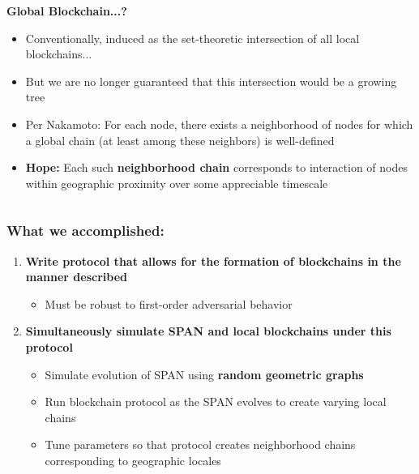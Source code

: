 \documentclass{beamer}
\begin{document}
\begin{frame}
\begin{columns}
		\begin{column}{0.4\textwidth}
			\centering
			\textbf{Global Blockchain...?}
			\begin{scriptsize}
				\begin{itemize}
					\item Conventionally, induced as the set-theoretic
						intersection of all local blockchains...
					\item But we are no longer guaranteed that this
						intersection would be a growing tree
					\item Per Nakamoto: For each node,
						there exists a neighborhood of nodes for which
						a global chain (at least among these neighbors) is
						well-defined
					\item \textbf{Hope:} Each such \textbf{neighborhood chain}
						corresponds to interaction of nodes within
						geographic proximity over some appreciable timescale
				\end{itemize}
			\end{scriptsize}
		\end{column}
	\end{columns}
\end{frame}

\begin{frame}
	\frametitle{What we accomplished:}

	\begin{enumerate}
		\item \textbf{Write protocol that allows for the formation of
			blockchains in the manner described}
			\begin{itemize}
				\item Must be robust to first-order
					adversarial behavior
			\end{itemize}
		\item \textbf{Simultaneously simulate SPAN and local blockchains
			under this protocol}
			\begin{itemize}
				\item Simulate evolution of SPAN using \textbf{random
					geometric graphs}
				\item Run blockchain protocol as the SPAN evolves to
					create varying local chains
				\item Tune parameters so that protocol creates
				neighborhood chains corresponding to geographic
				locales
			\end{itemize}
	\end{enumerate}
\end{frame}
\end{document}

